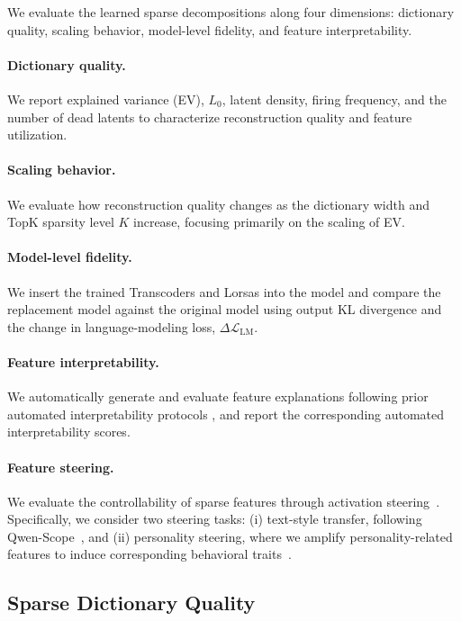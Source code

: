 \documentclass{article}
\begin{document}
We evaluate the learned sparse decompositions along four dimensions:
dictionary quality, scaling behavior, model-level fidelity, and feature
interpretability.

\paragraph{Dictionary quality.}
We report explained variance (EV), $L_0$, latent density, firing frequency,
and the number of dead latents to characterize reconstruction quality and
feature utilization.

\paragraph{Scaling behavior.}
We evaluate how reconstruction quality changes as the dictionary width and
TopK sparsity level $K$ increase, focusing primarily on the scaling of EV.

\paragraph{Model-level fidelity.}
We insert the trained Transcoders and Lorsas into the model and compare the
replacement model against the original model using output KL divergence and
the change in language-modeling loss,
$\Delta\mathcal{L}_{\mathrm{LM}}$.

\paragraph{Feature interpretability.}
We automatically generate and evaluate feature explanations following prior
automated interpretability protocols
\citep{cunningham2024circuits, karvonen2025saebench}, and report the
corresponding automated interpretability scores.

\paragraph{Feature steering.}
We evaluate the controllability of sparse features through activation 
steering~\citep{rimsky2024steering}. Specifically, we consider two steering tasks: 
(i) text-style transfer, following Qwen-Scope~\citep{deng2026qwenscope}, 
and (ii) personality steering, where we amplify personality-related features 
to induce corresponding behavioral traits~\citep{chen2025persona}.

\subsection{Sparse Dictionary Quality}
\end{document}
